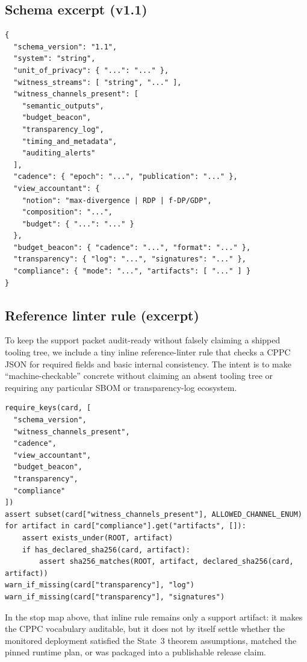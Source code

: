 \documentclass[11pt]{article}
\theoremstyle{definition}
\theoremstyle{remark}
\begin{document}
\subsection{Schema excerpt (v1.1)}
\begin{lstlisting}
{
  "schema_version": "1.1",
  "system": "string",
  "unit_of_privacy": { "...": "..." },
  "witness_streams": [ "string", "..." ],
  "witness_channels_present": [
    "semantic_outputs",
    "budget_beacon",
    "transparency_log",
    "timing_and_metadata",
    "auditing_alerts"
  ],
  "cadence": { "epoch": "...", "publication": "..." },
  "view_accountant": {
    "notion": "max-divergence | RDP | f-DP/GDP",
    "composition": "...",
    "budget": { "...": "..." }
  },
  "budget_beacon": { "cadence": "...", "format": "..." },
  "transparency": { "log": "...", "signatures": "..." },
  "compliance": { "mode": "...", "artifacts": [ "..." ] }
}
\end{lstlisting}

\subsection{Reference linter rule (excerpt)}
To keep the support packet audit-ready without falsely claiming a shipped tooling tree, we include a tiny inline reference-linter rule that checks a CPPC JSON for required fields and basic internal consistency.
The intent is to make ``machine-checkable'' concrete without claiming an absent tooling tree or requiring any particular SBOM or transparency-log ecosystem.

\begin{lstlisting}
require_keys(card, [
  "schema_version",
  "witness_channels_present",
  "cadence",
  "view_accountant",
  "budget_beacon",
  "transparency",
  "compliance"
])
assert subset(card["witness_channels_present"], ALLOWED_CHANNEL_ENUM)
for artifact in card["compliance"].get("artifacts", []):
    assert exists_under(ROOT, artifact)
    if has_declared_sha256(card, artifact):
        assert sha256_matches(ROOT, artifact, declared_sha256(card, artifact))
warn_if_missing(card["transparency"], "log")
warn_if_missing(card["transparency"], "signatures")
\end{lstlisting}

In the stop map above, that inline rule remains only a support artifact: it makes the CPPC vocabulary auditable, but it does not by itself settle whether the monitored deployment satisfied the State~3 theorem assumptions, matched the pinned runtime plan, or was packaged into a publishable release claim.
\end{document}
